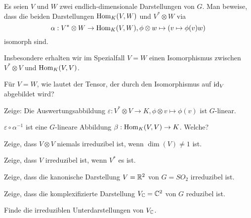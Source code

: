 \begin{sheet}
\begin{problem}\label{ex:hom_tensor_isomorphismus}
\begin{subproblem}
Es seien $V$ und $W$ zwei endlich-dimensionale Darstellungen von $G$. Man beweise, dass die beiden Darstellungen $\operatorname{Hom}_K(V,W)$ und $V^\ast \otimes W$ via
\[\alpha: V^\ast \otimes W \to \operatorname{Hom}_K(V,W), \phi \otimes w \mapsto (v\mapsto \phi(v)w)\]
isomorph sind.
\end{subproblem}

Insbesondere erhalten wir im Spezialfall $V=W$ einen Isomorphismus zwischen $V^\ast\otimes V$ und $\operatorname{Hom}_K(V,V)$.

\begin{subproblem}
Für $V=W$, wie lautet der Tensor, der durch den Isomorphismus auf $\operatorname{id}_V$ abgebildet wird?
\end{subproblem}

\begin{subproblem}
Zeige: Die Auswertungsabbildung $\varepsilon: V^\ast \otimes V \to K, \phi\otimes v\mapsto \phi(v)$ ist $G$-linear.
\end{subproblem}

\begin{subproblem}
$\varepsilon\circ\alpha^{-1}$ ist eine $G$-lineare Abbildung $\beta: \operatorname{Hom}_K(V,V) \to K$. Welche?
\end{subproblem}
\end{problem}


\begin{problem}
Zeige, dass $V\otimes V$ niemals irreduzibel ist, wenn $\dim(V) \neq 1$ ist.
\end{problem}

\begin{problem}
Zeige, dass $V$ irreduzibel ist, wenn $V^\ast$ es ist.
\end{problem}

\begin{problem}[title={Kanonische Darstellung von $SO_2$}]\label{ex:fundamentaldarstellung_von_so2}
\begin{subproblem}
Zeige, dass die kanonische Darstellung $V=\mathbb{R}^2$ von $G=SO_2$ irreduzibel ist.
\end{subproblem}
\begin{subproblem}
Zeige, dass die komplexifizierte Darstellung $V_{\mathbb{C}}=\mathbb{C}^2$ von $G$ reduzibel ist.
\end{subproblem}
\begin{subproblem}
Finde die irreduziblen Unterdarstellungen von $V_{\mathbb{C}}$.


\end{subproblem}
\end{problem}
\end{sheet}
